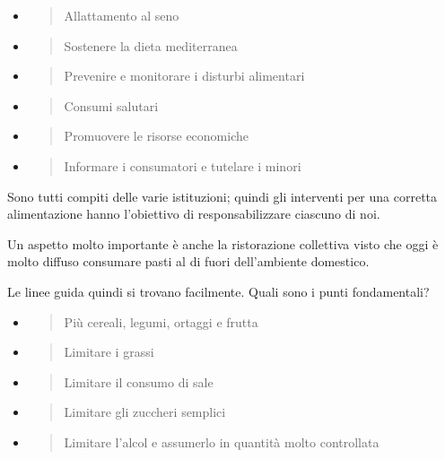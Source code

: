 \documentclass[]{article}
\begin{document}
\begin{itemize}
\item
  \begin{quote}
  Allattamento al seno
  \end{quote}
\item
  \begin{quote}
  Sostenere la dieta mediterranea
  \end{quote}
\item
  \begin{quote}
  Prevenire e monitorare i disturbi alimentari
  \end{quote}
\item
  \begin{quote}
  Consumi salutari
  \end{quote}
\item
  \begin{quote}
  Promuovere le risorse economiche
  \end{quote}
\item
  \begin{quote}
  Informare i consumatori e tutelare i minori
  \end{quote}
\end{itemize}

Sono tutti compiti delle varie istituzioni; quindi gli interventi per
una corretta alimentazione hanno l'obiettivo di responsabilizzare
ciascuno di noi.

Un aspetto molto importante è anche la ristorazione collettiva visto che
oggi è molto diffuso consumare pasti al di fuori dell'ambiente
domestico.

Le linee guida quindi si trovano facilmente. Quali sono i punti
fondamentali?

\begin{itemize}
\item
  \begin{quote}
  Più cereali, legumi, ortaggi e frutta
  \end{quote}
\item
  \begin{quote}
  Limitare i grassi
  \end{quote}
\item
  \begin{quote}
  Limitare il consumo di sale
  \end{quote}
\item
  \begin{quote}
  Limitare gli zuccheri semplici
  \end{quote}
\item
  \begin{quote}
  Limitare l'alcol e assumerlo in quantità molto controllata
  \end{quote}
\end{itemize}
\end{document}
